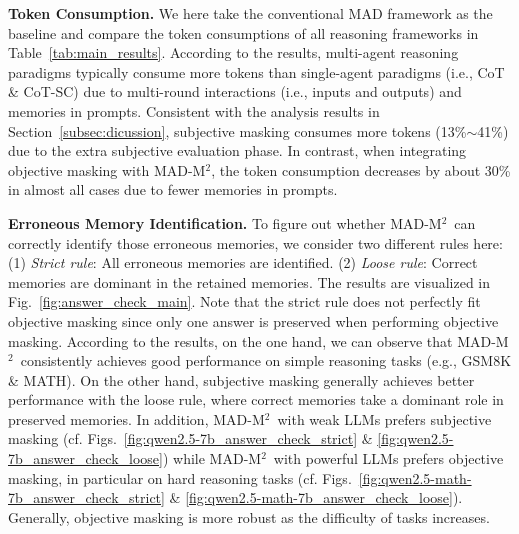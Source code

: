\documentclass{article} %
\newcommand{\methodname}{MAD-M$^2$}
\theoremstyle{plain}
\begin{document}
\textbf{Token Consumption.} We here take the conventional MAD framework as the baseline and compare the token consumptions of all reasoning frameworks in Table~\ref{tab:main_results}. According to the results, multi-agent reasoning paradigms typically consume more tokens than single-agent paradigms (i.e., CoT \& CoT-SC) due to multi-round interactions (i.e., inputs and outputs) and memories in prompts. Consistent with the analysis results in Section~\ref{subsec:dicussion}, subjective masking consumes more tokens (13\%$\sim$41\%) due to the extra subjective evaluation phase. In contrast, when integrating objective masking with \methodname, the token consumption decreases by about 30\% in almost all cases due to fewer memories in prompts. %

\textbf{Erroneous Memory Identification.} To figure out whether \methodname\ can correctly identify those erroneous memories, we consider two different rules here: (1) \textit{Strict rule}: All erroneous memories are identified. (2) \textit{Loose rule}: Correct memories are dominant in the retained memories. 
The results are visualized in Fig.~\ref{fig:answer_check_main}. Note that the strict rule does not perfectly fit objective masking since only one answer is preserved when performing objective masking. According to the results, on the one hand, we can observe that \methodname\ consistently achieves good performance on simple reasoning tasks (e.g., GSM8K \& MATH). On the other hand, subjective masking generally achieves better performance with the loose rule, where correct memories take a dominant role in preserved memories. In addition, \methodname\ with weak LLMs prefers subjective masking (cf. Figs.~\ref{fig:qwen2.5-7b_answer_check_strict} \& \ref{fig:qwen2.5-7b_answer_check_loose}) while \methodname\ with powerful LLMs prefers objective masking, in particular on hard reasoning tasks (cf. Figs.~\ref{fig:qwen2.5-math-7b_answer_check_strict} \& \ref{fig:qwen2.5-math-7b_answer_check_loose}). Generally, objective masking is more robust as the difficulty of tasks increases.
\end{document}
